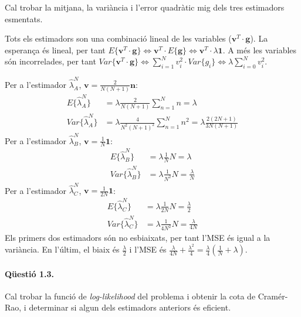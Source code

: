 \documentclass[catalan]{scrartcl}
\begin{document}
Cal trobar la mitjana, la variància i l'error quadràtic mig dels
tres estimadors esmentats.

Tots els estimadors son una combinació lineal de les variables
($\mathbf{v}^T \cdot \mathbf{g}$). La esperança és lineal, per tant
$E\{ \mathbf{v}^T \cdot \mathbf{g} \} \Leftrightarrow
\mathbf{v}^T \cdot E\{\mathbf{g}\} \Leftrightarrow
\mathbf{v}^T \cdot \lambda\mathbf{1}$.
A més les variables són incorrelades, per tant
$Var\{ \mathbf{v}^T \cdot \mathbf{g} \}
\Leftrightarrow \sum_{i=1}^N v_i^2 \cdot Var\{g_i\} \Leftrightarrow
\lambda \sum_{i=0}^N v_i^2$.

Per a l'estimador $\hat{\lambda}_A^N$, $\mathbf{v} =
\frac{2}{N(N+1)} \mathbf{n}$:
%
\begin{align}
  E\{\hat{\lambda}_A^N\} &= \lambda \frac{2}{N(N+1)} \sum_{n=1}^N n = \lambda
\\
  Var\{\hat{\lambda}_A^N\} &= \lambda \frac{4}{N^2(N+1)^2}
    \sum_{n=1}^N n^2
    = \lambda \frac{2(2N+1)}{3N(N+1)}
\end{align}
%
Per a l'estimador $\hat{\lambda}_B^N$, $\mathbf{v} =
\frac{1}{N} \mathbf{1}$:
%
\begin{align}
  E\{\hat{\lambda}_B^N\} &= \lambda \frac{1}{N} N = \lambda
\\
  Var\{\hat{\lambda}_B^N\} &= \lambda \frac{1}{N^2} N
    = \frac{\lambda}{N}
\end{align}
%
Per a l'estimador $\hat{\lambda}_C^N$, $\mathbf{v} =
\frac{1}{2N} \mathbf{1}$:
%
\begin{align}
  E\{\hat{\lambda}_C^N\} &= \lambda \frac{1}{2N} N = \frac{\lambda}{2}
\\
  Var\{\hat{\lambda}_C^N\} &= \lambda \frac{1}{4N^2} N
    = \frac{\lambda}{4N}
\end{align}
%
Els primers dos estimadors són no esbiaixats, per tant l'MSE és igual a la
variància. En l'últim, el biaix és $\frac{\lambda}{2}$ i l'MSE és
$\frac{\lambda}{4N} + \frac{\lambda^2}{4} = \frac{\lambda}{4} (\frac{1}{N} + \lambda)$.

\paragraph{Qüestió 1.3.}

Cal trobar la funció de \emph{log-likelihood} del problema i obtenir la cota de
Cramér-Rao, i determinar si algun dels estimadors anteriors és eficient.
\end{document}
